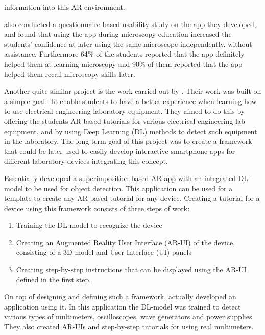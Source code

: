 information into this AR-environment.\cite{pylvanainen} \par
	\textcite{pylvanainen} also conducted a questionnaire-based usability 
study on the app they developed, and found that using the app during 
microscopy education increased the students' confidence at later using the 
same microscope independently, without assistance. Furthermore 64\% of the 
students reported that the app definitely helped them at learning microscopy 
and 90\% of them reported that the app helped them recall microscopy skills 
later.\cite{pylvanainen} \par
	Another quite similar project is the work carried out by 
\textcite{estrada}. Their work was built on a simple goal: To enable students 
to have a better experience when learning how to use electrical engineering 
laboratory equipment. They aimed to do this by offering the students AR-based 
tutorials for various electrical engineering lab equipment, and by using Deep 
Learning (DL) methods to detect such equipment in the 
laboratory.\cite{estrada} The long term goal of this project was to create a 
framework that could be later used to easily develop interactive smartphone 
apps for different laboratory devices integrating this 
concept.\cite{estrada} \par
	Essentially \textcite{estrada} developed a superimposition-based 
AR-app with an integrated DL-model to be used for object detection. This 
application can be used for a template to create any AR-based tutorial for 
any device. Creating a tutorial for a device using this framework consists of 
three steps of work:
\begin{enumerate}
	\item Training the DL-model to recognize the device
	\item Creating an Augmented Reality User Interface (AR-UI) of the device, consisting of a 3D-model and User Interface (UI) panels
	\item Creating step-by-step instructions that can be displayed using the AR-UI defined in the first step.
\end{enumerate} \par
	On top of designing and defining such a framework, \textcite{estrada} 
actually developed an application using it. In this application the DL-model 
was trained to detect various types of multimeters, oscilloscopes, wave 
generators and power supplies. They also created AR-UIs and step-by-step 
tutorials for using real multimeters.\cite{estrada}\par
